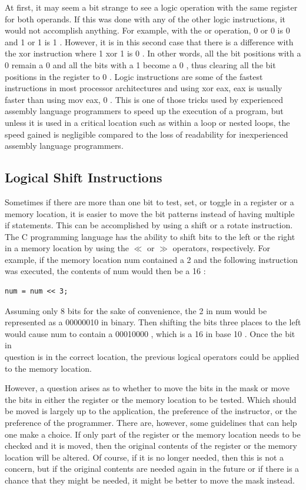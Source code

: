 \documentclass[10pt]{book}
\begin{document}
At first, it may seem a bit strange to see a logic operation with the same register for both operands. If this was done with any of the other logic instructions, it would not accomplish anything. For example, with the or operation, 0 or 0 is 0 and 1 or 1 is 1 . However, it is in this second case that there is a difference with the xor instruction where 1 xor 1 is 0 . In other words, all the bit positions with a 0 remain a 0 and all the bits with a 1 become a 0 , thus clearing all the bit positions in the register to 0 . Logic instructions are some of the fastest instructions in most processor architectures and using xor eax, eax is usually faster than using mov eax, 0 . This is one of those tricks used by experienced assembly language programmers to speed up the execution of a program, but unless it is used in a critical location such as within a loop or nested loops, the speed gained is negligible compared to the loss of readability for inexperienced assembly language programmers.

\subsection{Logical Shift Instructions}
Sometimes if there are more than one bit to test, set, or toggle in a register or a memory location, it is easier to move the bit patterns instead of having multiple if statements. This can be accomplished by using a shift or a rotate instruction. The C programming language has the ability to shift bits to the left or the right in a memory location by using the $\ll$ or $\gg$ operators, respectively. For example, if the memory location num contained a 2 and the following instruction was executed, the contents of num would then be a 16 :

\begin{verbatim}
num = num << 3;
\end{verbatim}

Assuming only 8 bits for the sake of convenience, the 2 in num would be represented as a 00000010 in binary. Then shifting the bits three places to the left would cause num to contain a 00010000 , which is a 16 in base 10 . Once the bit in\\
question is in the correct location, the previous logical operators could be applied to the memory location.


However, a question arises as to whether to move the bits in the mask or move the bits in either the register or the memory location to be tested. Which should be moved is largely up to the application, the preference of the instructor, or the preference of the programmer. There are, however, some guidelines that can help one make a choice. If only part of the register or the memory location needs to be checked and it is moved, then the original contents of the register or the memory location will be altered. Of course, if it is no longer needed, then this is not a concern, but if the original contents are needed again in the future or if there is a chance that they might be needed, it might be better to move the mask instead.
\end{document}

